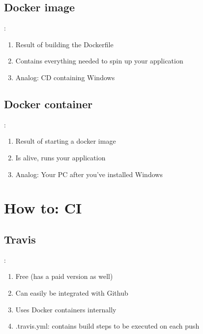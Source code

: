 \documentclass{beamer}
\begin{document}
\subsection{Docker image}
\begin{frame}{\secname : \subsecname}


\begin{enumerate}
    \item Result of building the Dockerfile
    \item Contains everything needed to spin up your application
    \item Analog: CD containing Windows
\end{enumerate}

\end{frame}

\subsection{Docker container}
\begin{frame}{\secname : \subsecname}


\begin{enumerate}
    \item Result of starting a docker image
    \item Is alive, runs your application
    \item Analog: Your PC after you've installed Windows
\end{enumerate}

\end{frame}


\section{How to: CI}

\subsection{Travis}
\begin{frame}{\secname : \subsecname}


\begin{enumerate}
    \item Free (has a paid version as well)
    \item Can easily be integrated with Github
    \item Uses Docker containers internally
    \item .travis.yml: contains build steps to be executed on each push
\end{enumerate}
\end{frame}
\end{document}
